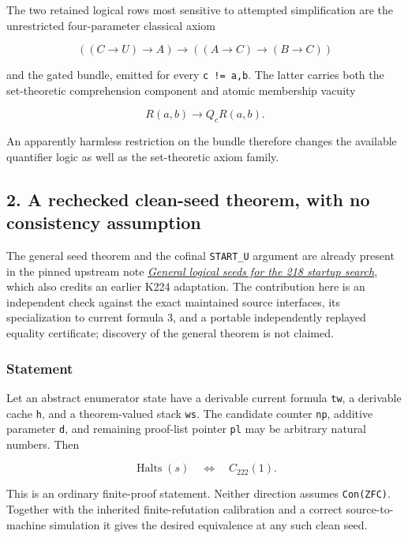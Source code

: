 \documentclass[
  11pt,
]{article}
\begin{document}
The two retained logical rows most sensitive to attempted simplification
are the unrestricted four-parameter classical axiom

\[
((C\to U)\to A)\to((A\to C)\to(B\to C))
\]

and the gated bundle, emitted for every \texttt{c\ !=\ a,b}. The latter
carries both the set-theoretic comprehension component and atomic
membership vacuity

\[
R(a,b)\to Q_c R(a,b).
\]

An apparently harmless restriction on the bundle therefore changes the
available quantifier logic as well as the set-theoretic axiom family.

\hypertarget{a-rechecked-clean-seed-theorem-with-no-consistency-assumption}{%
\subsection{2. A rechecked clean-seed theorem, with no consistency
assumption}\label{a-rechecked-clean-seed-theorem-with-no-consistency-assumption}}

The general seed theorem and the cofinal \texttt{START\_U} argument are
already present in the pinned upstream note
\href{https://github.com/VladimirReshetnikov/ProveIt/blob/704b87442afbd571833a628cd558f1d207fd8b2f/SetTheory/Cardinals/docs/reports/set-theory/zfc-closure-kernels/146-r218-res-src218-general_seed_lemma.md}{\emph{General
logical seeds for the 218 startup search}}, which also credits an
earlier K224 adaptation. The contribution here is an independent check
against the exact maintained source interfaces, its specialization to
current formula 3, and a portable independently replayed equality
certificate; discovery of the general theorem is not claimed.

\hypertarget{statement}{%
\subsubsection{Statement}\label{statement}}

Let an abstract enumerator state have a derivable current formula
\texttt{tw}, a derivable cache \texttt{h}, and a theorem-valued stack
\texttt{ws}. The candidate counter \texttt{np}, additive parameter
\texttt{d}, and remaining proof-list pointer \texttt{pl} may be
arbitrary natural numbers. Then

\[
\operatorname{Halts}(s)\quad\Longleftrightarrow\quad C_{222}(1).
\]

This is an ordinary finite-proof statement. Neither direction assumes
\texttt{Con(ZFC)}. Together with the inherited finite-refutation
calibration and a correct source-to-machine simulation it gives the
desired equivalence at any such clean seed.
\end{document}
